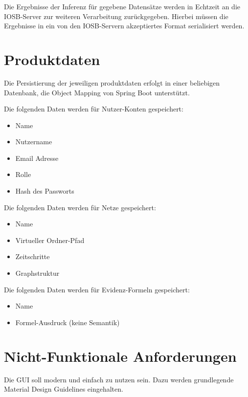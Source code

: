 \documentclass[parskip=full,11pt,twoside]{scrartcl}
\begin{document}
Die Ergebnisse der Inferenz für gegebene Datensätze werden in Echtzeit an die IOSB-Server zur weiteren Verarbeitung zurückgegeben. Hierbei müssen die Ergebnisse in ein von den IOSB-Servern akzeptiertes Format serialisiert werden.

\section{Produktdaten}
Die Persistierung der jeweiligen \Gls{produktdaten} erfolgt in einer beliebigen Datenbank, die Object Mapping von Spring Boot unterstützt.

Die folgenden Daten werden für Nutzer-Konten gespeichert:
\begin{itemize}
  \item Name
  \item Nutzername
  \item Email Adresse
  \item Rolle
  \item Hash des Passworts
\end{itemize}

Die folgenden Daten werden für Netze gespeichert:
\begin{itemize}
  \item Name
  \item Virtueller Ordner-Pfad
  \item Zeitschritte
  \item Graphstruktur
\end{itemize}

Die folgenden Daten werden für Evidenz-Formeln gespeichert:
\begin{itemize}
  \item Name
  \item Formel-Ausdruck (keine Semantik)
\end{itemize}

\section{Nicht-Funktionale Anforderungen}


Die GUI soll modern und einfach zu nutzen sein. Dazu werden grundlegende Material Design Guidelines eingehalten.
\end{document}
